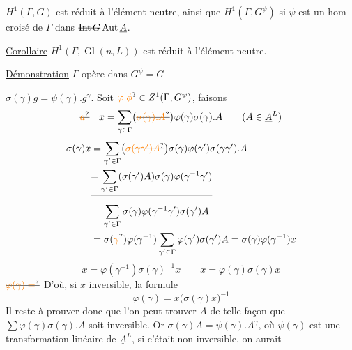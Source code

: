 $H^1(\Gamma,G)$ est réduit à l'élément neutre, ainsi que $H^1(\Gamma,G^\psi)$ si $\psi$ est un hom croisé de $\Gamma$ dans $\deleted{\operatorname{Int}G}\operatorname{Aut}\underline A$.

\uline{Corollaire} $H^1(\Gamma,\operatorname{Gl}(n,L))$ est réduit à l'élément neutre.

\uline{Démonstration} $\Gamma$ opère dans $G^\psi=G$

$\sigma(\gamma)g=\psi(\gamma).g^\gamma$. Soit $\unsure{\varphi|\phi}\in Z^1(\Gamma,G^\psi)$,  faisons
\[
\deleted{\unsure{a}}\quad x=\sum_{\gamma\in\Gamma}\bigl(\deleted{\unsure{\sigma(\gamma).A}}\bigr)\varphi(\gamma)\sigma(\gamma).A\qquad(A\in\underline A^L)
\]
\deleted{\unsure{$\exists$}}
\[
\begin{aligned}
\sigma(\gamma)x&=\sum_{\gamma'\in\Gamma}\bigl(\deleted{\unsure{\sigma(\gamma\gamma')A}}\bigr)\sigma(\gamma)\varphi(\gamma')\sigma(\gamma\gamma').A\\
&\deleted{=\sum_{\gamma'\in\Gamma}(\sigma(\gamma')A)\sigma(\gamma)\varphi(\gamma^{-1}\gamma')}\\
&=\sum_{\gamma'\in\Gamma}\sigma(\gamma)\varphi(\gamma^{-1}\gamma')\sigma(\gamma')A\\
&=\sigma(\unsure{\gamma})\varphi(\gamma^{-1})\sum_{\gamma'\in\Gamma}\varphi(\gamma')\sigma(\gamma')A=\sigma(\gamma)\varphi(\gamma^{-1})x
\end{aligned}
\]
\[
x=\varphi(\gamma^{-1})\sigma(\gamma)^{-1}x\qquad x=\varphi(\gamma)\sigma(\gamma)x
\]
$\deleted{\unsure{\varphi(\gamma)=}}$ D'où, \uline{si $x$ inversible}, la formule
\[
\varphi(\gamma)=x\bigl(\sigma(\gamma)x\bigr)^{-1}
\]
Il reste à prouver donc que l'on peut trouver $A$ de telle façon que $\sum\varphi(\gamma)\sigma(\gamma).A$ soit
inversible. Or $\sigma(\gamma)A=\psi(\gamma).A^\gamma$, où $\psi(\gamma)$ est une transformation linéaire de $\underline A^L$, si c'était non inversible, on aurait 

